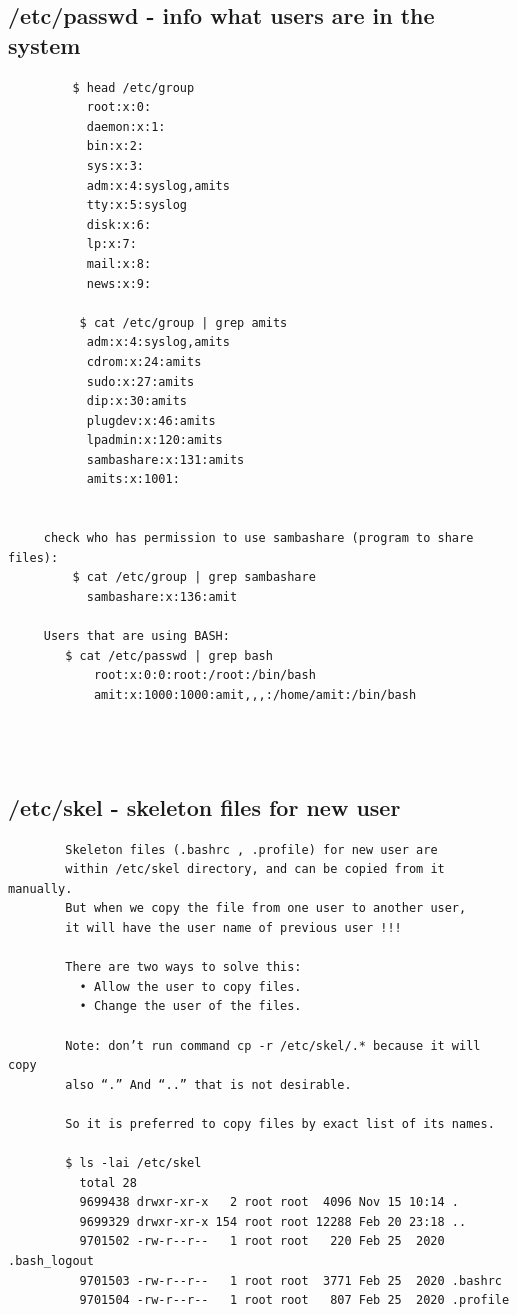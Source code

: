 \documentclass[a4paper,12pt]{article}
\begin{document}
\subsection{/etc/passwd - info what users are in the system }
\begin{verbatim}
         $ head /etc/group
           root:x:0:
           daemon:x:1:
           bin:x:2:
           sys:x:3:
           adm:x:4:syslog,amits
           tty:x:5:syslog
           disk:x:6:
           lp:x:7:
           mail:x:8:
           news:x:9:

          $ cat /etc/group | grep amits
           adm:x:4:syslog,amits
           cdrom:x:24:amits
           sudo:x:27:amits
           dip:x:30:amits
           plugdev:x:46:amits
           lpadmin:x:120:amits
           sambashare:x:131:amits
           amits:x:1001:


     check who has permission to use sambashare (program to share files):
         $ cat /etc/group | grep sambashare
           sambashare:x:136:amit
     
     Users that are using BASH: 
        $ cat /etc/passwd | grep bash
            root:x:0:0:root:/root:/bin/bash
            amit:x:1000:1000:amit,,,:/home/amit:/bin/bash      
           
           
           
\end{verbatim}

\subsection{/etc/skel - skeleton files for new user}

\begin{verbatim}
        Skeleton files (.bashrc , .profile) for new user are 
        within /etc/skel directory, and can be copied from it manually. 
        But when we copy the file from one user to another user, 
        it will have the user name of previous user !!!
        
        There are two ways to solve this:
          • Allow the user to copy files.
          • Change the user of the files.

        Note: don’t run command cp -r /etc/skel/.* because it will copy          
        also “.” And “..” that is not desirable.

        So it is preferred to copy files by exact list of its names. 
        
        $ ls -lai /etc/skel
          total 28
          9699438 drwxr-xr-x   2 root root  4096 Nov 15 10:14 .
          9699329 drwxr-xr-x 154 root root 12288 Feb 20 23:18 ..
          9701502 -rw-r--r--   1 root root   220 Feb 25  2020 .bash_logout
          9701503 -rw-r--r--   1 root root  3771 Feb 25  2020 .bashrc
          9701504 -rw-r--r--   1 root root   807 Feb 25  2020 .profile

\end{verbatim}
\end{document}

